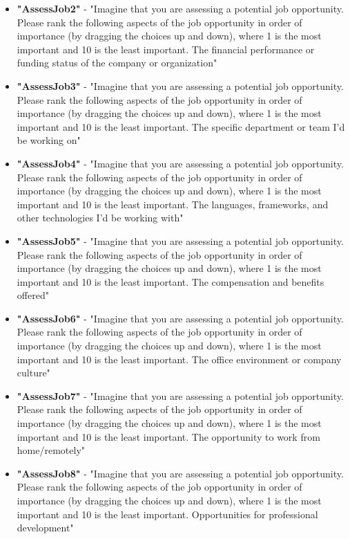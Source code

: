 \begin{appendices}
\begin{itemize}
        \item \textbf{"AssessJob2"} - "Imagine that you are assessing a potential job opportunity. Please rank the following aspects of the job opportunity in order of importance (by dragging the choices up and down), where 1 is the most important and 10 is the least important. The financial performance or funding status of the company or organization"
        \item \textbf{"AssessJob3"} - "Imagine that you are assessing a potential job opportunity. Please rank the following aspects of the job opportunity in order of importance (by dragging the choices up and down), where 1 is the most important and 10 is the least important. The specific department or team I'd be working on"
        \item \textbf{"AssessJob4"} - "Imagine that you are assessing a potential job opportunity. Please rank the following aspects of the job opportunity in order of importance (by dragging the choices up and down), where 1 is the most important and 10 is the least important. The languages, frameworks, and other technologies I'd be working with"
        \item \textbf{"AssessJob5"} - "Imagine that you are assessing a potential job opportunity. Please rank the following aspects of the job opportunity in order of importance (by dragging the choices up and down), where 1 is the most important and 10 is the least important. The compensation and benefits offered"
        \item \textbf{"AssessJob6"} - "Imagine that you are assessing a potential job opportunity. Please rank the following aspects of the job opportunity in order of importance (by dragging the choices up and down), where 1 is the most important and 10 is the least important. The office environment or company culture"
        \item \textbf{"AssessJob7"} - "Imagine that you are assessing a potential job opportunity. Please rank the following aspects of the job opportunity in order of importance (by dragging the choices up and down), where 1 is the most important and 10 is the least important. The opportunity to work from home/remotely"
        \item \textbf{"AssessJob8"} - "Imagine that you are assessing a potential job opportunity. Please rank the following aspects of the job opportunity in order of importance (by dragging the choices up and down), where 1 is the most important and 10 is the least important. Opportunities for professional development"

\end{itemize}
\end{appendices}
